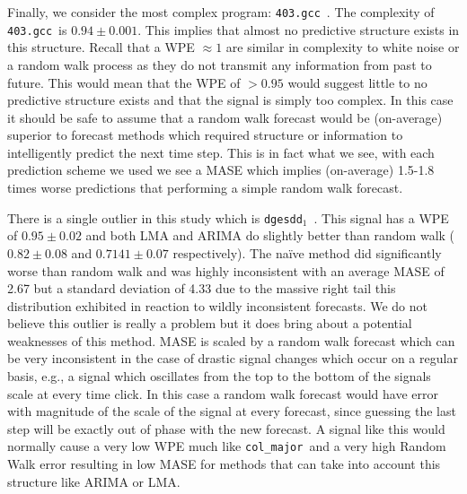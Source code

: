 \documentclass{article}
\newcommand{\gcc}{{\tt 403.gcc}~}
\newcommand{\svdone}{{\tt dgesdd}$_1$~}
\newcommand{\col}{{\tt col\_major}~}
\begin{document}
Finally, we consider the most complex program: \gcc. The complexity of \gcc is $0.94 \pm 0.001$. This implies that almost no predictive structure exists in this structure. Recall that a WPE $\approx 1$ are similar in complexity to white noise or a random walk process as they do not transmit any information from past to future. This would mean that the WPE of $>0.95$ would suggest little to no predictive structure exists and that the signal is simply too complex. In this case it should be safe to assume that a random walk forecast would be (on-average) superior to forecast methods which required structure or information to intelligently predict the next time step. This is in fact what we see, with each prediction scheme we used we see a MASE which implies (on-average) 1.5-1.8 times worse predictions that performing a simple random walk forecast. 

There is a single outlier in this study which is \svdone. This signal has a WPE of $0.95 \pm 0.02$ and both LMA and ARIMA do slightly better than random walk ($0.82 \pm 0.08$ and $0.7141 \pm 0.07$ respectively). The na\"ive method did significantly worse than random walk and was highly inconsistent with an average MASE of 2.67 but a standard deviation of 4.33 due to the massive right tail this distribution exhibited in reaction to wildly inconsistent forecasts. We do not believe this outlier is really a problem but it does bring about a potential weaknesses of this method. MASE is scaled by a random walk forecast which can be very inconsistent in the case of drastic signal changes which occur on a regular basis, e.g., a signal which oscillates from the top to the bottom of the signals scale at every time click. In this case a random walk forecast would have error with magnitude of the scale of the signal at every forecast, since guessing the last step will be exactly out of phase with the new forecast. A signal like this would normally cause a very low WPE much like \col and a very high Random Walk error resulting in low MASE for methods that can take into account this structure like ARIMA or LMA. 
\end{document}
